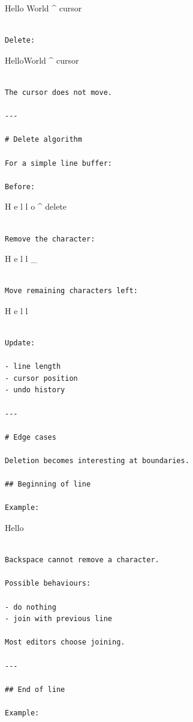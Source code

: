 \documentclass[
  oneside,
  openany]{book}
\begin{document}
Hello World \^{} cursor

\begin{verbatim}

Delete:
\end{verbatim}

HelloWorld \^{} cursor

\begin{verbatim}

The cursor does not move.

---

# Delete algorithm

For a simple line buffer:

Before:
\end{verbatim}

H e l l o \^{} delete

\begin{verbatim}

Remove the character:
\end{verbatim}

H e l l \_

\begin{verbatim}

Move remaining characters left:
\end{verbatim}

H e l l

\begin{verbatim}

Update:

- line length
- cursor position
- undo history

---

# Edge cases

Deletion becomes interesting at boundaries.

## Beginning of line

Example:
\end{verbatim}

\textbar Hello

\begin{verbatim}

Backspace cannot remove a character.

Possible behaviours:

- do nothing
- join with previous line

Most editors choose joining.

---

## End of line

Example:
\end{verbatim}
\end{document}
